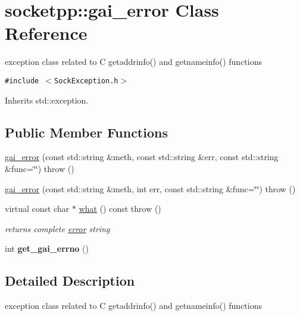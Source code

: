 \hypertarget{classsocketpp_1_1gai__error}{
\section{socketpp::gai\_\-error Class Reference}
\label{classsocketpp_1_1gai__error}
}
exception class related to C getaddrinfo() and getnameinfo() functions  


{\tt \#include $<$SockException.h$>$}

Inherits std::exception.

\subsection*{Public Member Functions}
\begin{CompactItemize}
\item 
\hyperlink{classsocketpp_1_1gai__error_617e195448875097f6561a39cca1f49b}{gai\_\-error} (const std::string \&meth, const std::string \&err, const std::string \&func=\char`\"{}\char`\"{})  throw ()
\item 
\hyperlink{classsocketpp_1_1gai__error_fc03a724180e0edd90f7502eedb68da1}{gai\_\-error} (const std::string \&meth, int err, const std::string \&func=\char`\"{}\char`\"{})  throw ()
\item 
\hypertarget{classsocketpp_1_1gai__error_1ee33e241f637684183e4c395a22a1df}{
virtual const char $\ast$ \hyperlink{classsocketpp_1_1gai__error_1ee33e241f637684183e4c395a22a1df}{what} () const   throw ()}
\label{classsocketpp_1_1gai__error_1ee33e241f637684183e4c395a22a1df}

\begin{CompactList}\small\item\em returns complete \hyperlink{classsocketpp_1_1error}{error} string \item\end{CompactList}\item 
\hypertarget{classsocketpp_1_1gai__error_efbf63e4224a250edc14f09bd15a1d3b}{
int \textbf{get\_\-gai\_\-errno} ()}
\label{classsocketpp_1_1gai__error_efbf63e4224a250edc14f09bd15a1d3b}

\end{CompactItemize}


\subsection{Detailed Description}
exception class related to C getaddrinfo() and getnameinfo() functions 

